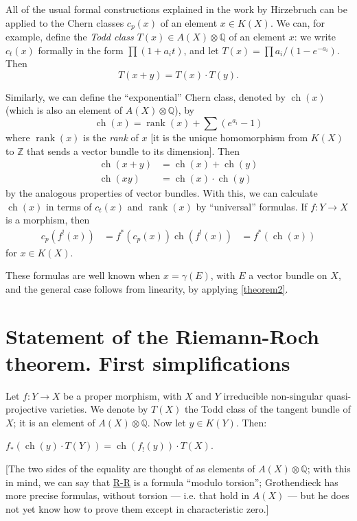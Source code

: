 \documentclass{article}
\theoremstyle{plain}
\newenvironment{theorem}[1]
    {\renewcommand\theinnercustomtheorem{#1}\innercustomtheorem}
    {\endinnercustomtheorem}
\theoremstyle{definition}
\DeclareMathOperator{\ch}{ch}
\DeclareMathOperator{\rank}{rank}
\newcommand{\oldpage}[1]{\marginpar{\footnotesize$\Big\vert$ \textit{p.~#1}}}
\begin{document}
All of the usual formal constructions explained in the work by Hirzebruch \cite{9} can be applied to the Chern classes $c_p(x)$ of an element $x\in K(X)$.
We can, for example, define the \emph{Todd class $T(x)\in A(X)\otimes\mathbb{Q}$} of an element $x$:
we write $c_t(x)$ formally in the form $\prod(1+a_it)$, and let $T(x)=\prod a_i/(1-e^{-a_i})$.
Then
\[
  T(x+y) = T(x)\cdot T(y).
\]

Similarly, we can define the ``exponential'' Chern class, denoted by $\ch(x)$ (which is also an element of $A(X)\otimes\mathbb{Q}$), by
\[
  \ch(x) = \rank(x)+\sum(e^{a_i}-1)
\]
where $\rank(x)$ is the \emph{rank} of $x$ [it is the unique homomorphism from $K(X)$ to $\mathbb{Z}$ that sends a vector bundle to its dimension].
Then
\[
  \begin{aligned}
    \ch(x+y) &= \ch(x)+\ch(y)
  \\\ch(xy) &= \ch(x)\cdot\ch(y)
  \end{aligned}
\]
by the analogous properties of vector bundles.
With this, we can calculate $\ch(x)$ in terms of $c_t(x)$ and $\rank(x)$ by ``universal'' formulas.
If $f\colon Y\to X$ is a morphism, then
\[
  \begin{aligned}
    c_p(f^!(x)) &= f^*(c_p(x))
    \ch(f^!(x)) &= f^*(\ch(x))
  \end{aligned}
\]
for $x\in K(X)$.

These formulas are well known when $x=\gamma(E)$, with $E$ a vector bundle on $X$, and the general case follows from linearity, by applying \cref{theorem2}.


\section{Statement of the Riemann-Roch theorem. First simplifications}
\label{section7}

\oldpage{113}
Let $f\colon Y\to X$ be a proper morphism, with $X$ and $Y$ irreducible non-singular quasi-projective varieties.
We denote by $T(X)$ the Todd class of the tangent bundle of $X$;
it is an element of $A(X)\otimes\mathbb{Q}$.
Now let $y\in K(Y)$.
Then:

\begin{theorem}{(Riemann-Roch)}
\label{theoremriemannroch}
  $f_*(\ch(y)\cdot T(Y)) = \ch(f_!(y))\cdot T(X)$.
\end{theorem}

[The two sides of the equality are thought of as elements of $A(X)\otimes\mathbb{Q}$;
with this in mind, we can say that \hyperref[theoremriemannroch]{R-R} is a formula ``modulo torsion'';
Grothendieck has more precise formulas, without torsion --- i.e. that hold in $A(X)$ --- but he does not yet know how to prove them except in characteristic zero.]
\end{document}
